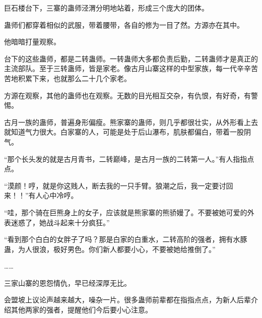 \begin{this_body}
巨石楼台下，三寨的蛊师泾渭分明地站着，形成三个庞大的团体。

蛊师们都穿着相似的武服，带着腰带，各自的修为一目了然。方源亦在其中。

他暗暗打量观察。

台下的这些蛊师，都是二转蛊师。一转蛊师大多都负责后勤，二转蛊师才是真正的主流部队。至于三转蛊师，皆是家老。像古月山寨这样的中型家族，每一代辛辛苦苦地积累下来，也就那么二十几个家老。

方源在观察，其他的蛊师也在观察。无数的目光相互交杂，有仇恨，有好奇，有警惕。

古月一族的蛊师，普遍身形偏瘦。熊家寨的蛊师，则几乎都很壮实，从外形看上去就知道气力很大。白家寨的人，可能是处于后山瀑布，肌肤都偏白，带着一股阴气。

“那个长头发的就是古月青书，二转巅峰，是古月一族的二转第一人。”有人指指点点。

“漠颜！哼，就是你这贱人，断去我的一只手臂。狼潮之后，我一定要讨回来！！”有人心中冷哼。

“哇，那个骑在巨熊身上的女子，应该就是熊家寨的熊骄嫚了。不要被她可爱的外表迷惑了，她战斗起来十分疯狂。”

“看到那个白白的女胖子了吗？那是白家的白重水，二转高阶的强者，拥有水豚蛊，为人很浪，极好男色。你们新人都要小心，不要被她给推倒了。”

……

三家山寨的恩怨情仇，早已经深厚无比。

会盟坡上议论声越来越大，噪杂一片。很多蛊师前辈都在指指点点，为新人后辈介绍其他两家的强者，提醒他们今后要小心注意。

\end{this_body}

